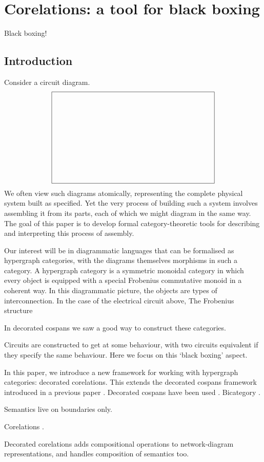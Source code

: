 \chapter{Corelations: a tool for black boxing} \label{ch.corelations}

Black boxing!

\section{Introduction}

Consider a circuit diagram.
\[
  \begin{tikzpicture}
    \draw (0,0) -- (0,4.5) -- (8,4.5) -- (8,0) -- (0,0);
  \end{tikzpicture}
\]
We often view such diagrams atomically, representing the complete physical
system built as specified. Yet the very process of building such a system
involves assembling it from its parts, each of which we might diagram in the
same way. The goal of this paper is to develop formal category-theoretic tools
for describing and interpreting this process of assembly.

Our interest will be in diagrammatic languages that can be formalised as
hypergraph categories, with the diagrams themselves morphisms in such a
category. A hypergraph category is a symmetric monoidal category in which every
object is equipped with a special Frobenius commutative monoid in a coherent
way. In this diagrammatic picture, the objects are types of interconnection. In
the case of the electrical circuit above, The Frobenius structure

In decorated cospans we saw a good way to construct these categories.

Circuits are constructed to get at some behaviour, with two circuits equivalent
if they specify the same behaviour. Here we focus on this `black boxing' aspect.



In this paper, we introduce a new framework for working with hypergraph
categories: decorated corelations. This extends the decorated cospans framework
introduced in a previous paper \cite{F}. Decorated cospans have been
used \cite{BF, BFP, Po}. Bicategory \cite{Co}.

Semantics live on boundaries only.

Corelations \cite{CF}.

Decorated corelations adds compositional operations to network-diagram
representations, and handles composition of semantics too. 

